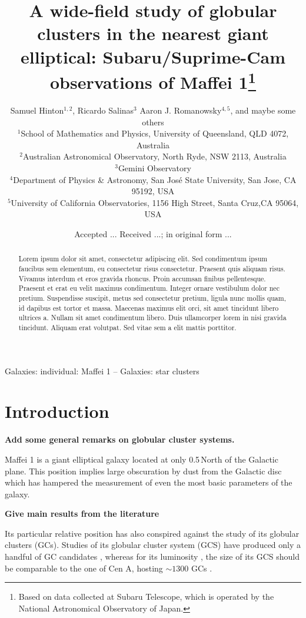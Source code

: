 \documentclass[useAMS,usenatbib]{mn2e}
\title[Globular clusters in Maffei 1]{A wide-field study of globular
  clusters in the nearest giant elliptical: Subaru/Suprime-Cam
  observations of Maffei 1\thanks{Based on data collected at Subaru
    Telescope, which is operated by the National Astronomical
    Observatory of Japan.}}
\author[S. Hinton et al.]{
Samuel Hinton$^{1,2}$, 
Ricardo Salinas$^{3}$%
Aaron J. Romanowsky$^{4,5}$, and maybe some others
\\
$^1$School of Mathematics and Physics, University of Queensland, QLD 4072, Australia \\
$^2$Australian Astronomical Observatory, North Ryde, NSW 2113, Australia \\
$^3$Gemini Observatory\\ 
$^4$Department of Physics \& Astronomy, San Jos\'e
  State University, San Jose, CA 95192, USA\\ 
$^5$University of California Observatories,
1156 High Street, Santa Cruz,CA 95064, USA
}
\begin{document}
\date{Accepted ... Received ...; in original form ...}


\pagerange{\pageref{firstpage}--\pageref{lastpage}} 

\maketitle

\label{firstpage}

\begin{abstract}
Lorem ipsum dolor sit amet, consectetur adipiscing elit. Sed condimentum ipsum faucibus sem elementum, eu consectetur risus consectetur. Praesent quis aliquam risus. Vivamus interdum et eros gravida rhoncus. Proin accumsan finibus pellentesque. Praesent et erat eu velit maximus condimentum. Integer ornare vestibulum dolor nec pretium. Suspendisse suscipit, metus sed consectetur pretium, ligula nunc mollis quam, id dapibus est tortor et massa. Maecenas maximus elit orci, sit amet tincidunt libero ultrices a. Nullam sit amet condimentum libero. Duis ullamcorper lorem in nisi gravida tincidunt. Aliquam erat volutpat. Sed vitae sem a elit mattis porttitor.
\end{abstract}

\begin{keywords}
Galaxies: individual: Maffei 1 -- Galaxies: star clusters
\end{keywords}

\section{Introduction}
\label{sec:intro}

{\bf Add some general remarks on globular cluster systems.}
 
Maffei 1 is a giant elliptical galaxy \citep{maffei68,spinrad71}
located at only 0.5\degr\,North of the Galactic plane. This position
implies large obscuration by dust from the Galactic disc which has
hampered the measurement of even the most basic parameters of the
galaxy.

{\bf Give main results from the literature}

Its particular relative position has also conspired against the study
of its globular clusters (GCs). Studies of its globular cluster system
(GCS) have produced only a handful of GC candidates
\citep{davidge02,buta03,davidge05}, whereas for its luminosity
\citep[$M_V\sim-20.80$,][]{fingerhut07}, the size of its GCS should be
comparable to the one of Cen A, hosting $\sim 1300$ GCs
\citep{harris10}. 
\end{document}
